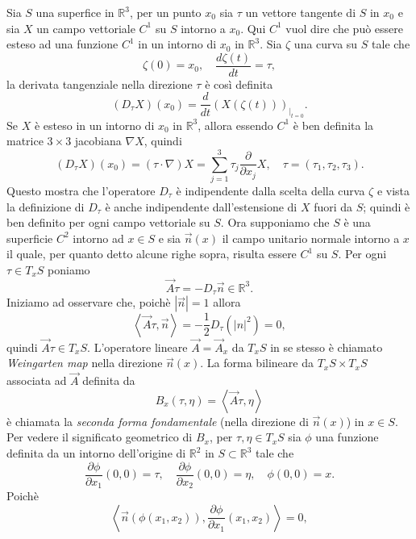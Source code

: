 Sia $S$ una superfice in $\mathbb{R}^3$, per un punto $x_0$ sia $\tau$ un vettore tangente di $S$ in $x_0$ e sia $X$ un campo vettoriale $C^1$ su $S$ intorno a $x_0$. Qui $C^1$ vuol dire che può essere esteso ad una funzione $C^1$ in un intorno di $x_0$ in $\mathbb{R}^3$. Sia $\zeta$ una curva su $S$ tale che
\[
\zeta(0)=x_0,\quad\frac{d\zeta(t)}{dt}=\tau,
\]
la derivata tangenziale nella direzione $\tau$ è così definita
\[
(D_{\tau}X)(x_0)=\frac{d}{dt}\left(X(\zeta(t))\right)_{|_{t=0}}.
\]
Se $X$ è esteso in un intorno di $x_0$ in $\mathbb{R}^3$, allora essendo $C^1$ è ben definita la matrice $3\times 3$ jacobiana $\nabla X$, quindi
\begin{equation}
\label{eq:cp1-1-01}
(D_{\tau}X)(x_0)=(\tau\cdot\nabla)X=\sum_{j=1}^3\tau_j\frac{\partial}{\partial x_j}X,\quad\tau=(\tau_1,\tau_2,\tau_3).
\end{equation}
Questo mostra che l'operatore $D_{\tau}$ è indipendente dalla scelta della curva $\zeta$ e vista la definizione di $D_{\tau}$ è anche indipendente dall'estensione di $X$ fuori da $S$; quindi è ben definito per ogni campo vettoriale su $S$.
Ora supponiamo che $S$ è una superficie $C^2$ intorno ad $x\in S$ e sia $\vec{n}(x)$ il campo unitario normale intorno a $x$ il quale, per quanto detto alcune righe sopra, risulta essere $C^1$ su $S$. Per ogni $\tau\in T_xS$ poniamo
\begin{equation}
\label{eq:cp1-1-02}
\vec{A}\tau=-D_{\tau}\vec{n}\in\mathbb{R}^3.
\end{equation}
Iniziamo ad osservare che, poichè $|\vec{n}|=1$ allora
\[
\left<\vec{A}\tau,\vec{n}\right>=-\frac{1}{2}D_{\tau}(|n|^2)=0,
\]
quindi $\vec{A}\tau\in T_xS$. L'operatore lineare $\vec{A}=\vec{A}_x$ da $T_xS$ in se stesso è chiamato \emph{Weingarten map} nella direzione $\vec{n}(x)$. La forma bilineare da $T_xS\times T_xS$ associata ad $\vec{A}$ definita da
\begin{equation}
\label{eq:cp1-1-03}
B_x(\tau,\eta)=\left<\vec{A}\tau,\eta\right>
\end{equation}
è chiamata la \emph{seconda forma fondamentale} (nella direzione di $\vec{n}(x)$) in $x\in S$. Per vedere il significato geometrico di $B_x$, per $\tau,\eta\in  T_xS$ sia $\phi$ una funzione  definita da un intorno dell'origine di $\mathbb{R}^2$ in $S\subset\mathbb{R}^3$ tale che
\[
\frac{\partial\phi}{\partial x_1}(0,0)=\tau,\quad\frac{\partial\phi}{\partial x_2}(0,0)=\eta,\quad\phi(0,0)=x.
\]
Poichè
\begin{equation}
\label{eq:cp1-1-04}
\left<\vec{n}(\phi(x_1,x_2)),\frac{\partial\phi}{\partial x_1}(x_1,x_2)\right>=0,
\end{equation}
